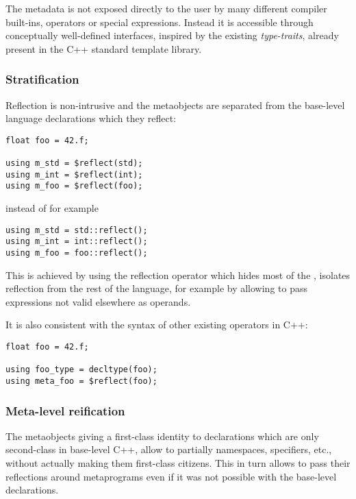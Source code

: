The metadata is not exposed directly to the user by many different compiler
built-ins, operators or special expressions.
Instead it is accessible through conceptually well-defined interfaces,
inspired by the existing {\em type-traits}, already present in
the C++ standard template library.

\subsubsection{Stratification}
\label{design-stratification}

Reflection is non-intrusive and the metaobjects are separated
from the base-level language declarations which they reflect:

\begin{verbatim}
float foo = 42.f;

using m_std = $reflect(std);
using m_int = $reflect(int);
using m_foo = $reflect(foo);
\end{verbatim}

instead of for example

\begin{verbatim}
using m_std = std::reflect();
using m_int = int::reflect();
using m_foo = foo::reflect();
\end{verbatim}

This is achieved by using the reflection operator which hides most of the
, isolates reflection from the rest of the language,
for example by allowing to pass expressions not valid elsewhere as operands.

It is also consistent with the syntax of other existing operators in C++:

\begin{verbatim}
float foo = 42.f;

using foo_type = decltype(foo);
using meta_foo = $reflect(foo);
\end{verbatim}

\subsubsection{Meta-level reification}
\label{design-reification}

The metaobjects giving a first-class identity to declarations
which are only second-class in base-level C++,
allow to partially  namespaces, specifiers, etc., without actually
making them first-class citizens. This in turn allows to pass their reflections around
metaprograms even if it was not possible with the base-level declarations.

